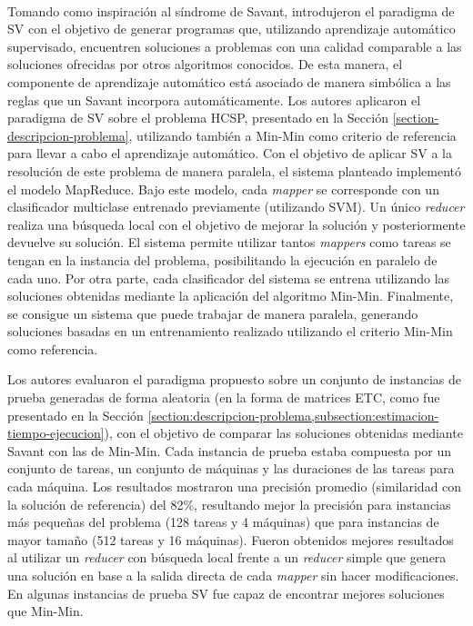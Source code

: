 \paragraph{}Tomando como inspiración al síndrome de Savant, \citet{savant-original} introdujeron el paradigma de SV con el objetivo de generar programas que, utilizando aprendizaje automático supervisado, encuentren soluciones a problemas con una calidad comparable a las soluciones ofrecidas por otros algoritmos conocidos.
De esta manera, el componente de aprendizaje automático está asociado de manera simbólica a las reglas que un Savant incorpora automáticamente.
Los autores aplicaron el paradigma de SV sobre el problema HCSP, presentado en la Sección \ref{section-descripcion-problema}, utilizando también a Min-Min como criterio de referencia para llevar a cabo el aprendizaje automático.
Con el objetivo de aplicar SV a la resolución de este problema de manera paralela, el sistema planteado implementó el modelo MapReduce.
Bajo este modelo, cada \textit{mapper} se corresponde con un clasificador multiclase entrenado previamente (utilizando SVM). Un único \textit{reducer} realiza una búsqueda local con el objetivo de mejorar la solución y posteriormente devuelve su solución.
El sistema permite utilizar tantos \textit{mappers} como tareas se tengan en la instancia del problema, posibilitando la ejecución en paralelo de cada uno.
Por otra parte, cada clasificador del sistema se entrena utilizando las soluciones obtenidas mediante la aplicación del algoritmo Min-Min.
Finalmente, se consigue un sistema que puede trabajar de manera paralela, generando soluciones basadas en un entrenamiento realizado utilizando el criterio Min-Min como referencia. 

Los autores evaluaron el paradigma propuesto sobre un conjunto de instancias de prueba generadas de forma aleatoria (en la forma de matrices ETC, como fue presentado en la Sección \ref{section:descripcion-problema,subsection:estimacion-tiempo-ejecucion}), con el objetivo de comparar las soluciones obtenidas mediante Savant con las de Min-Min.
Cada instancia de prueba estaba compuesta por un conjunto de tareas, un conjunto de máquinas y las duraciones de las tareas para cada máquina. 
Los resultados mostraron una precisión promedio (similaridad con la solución de referencia) del 82\%, resultando mejor la precisión para instancias más pequeñas del problema (128 tareas y 4 máquinas) que para instancias de mayor tamaño (512 tareas y 16 máquinas). 
Fueron obtenidos mejores resultados al utilizar un \textit{reducer} con búsqueda local frente a un \textit{reducer} simple que genera una solución en base a la salida directa de cada \textit{mapper} sin hacer modificaciones.
En algunas instancias de prueba SV fue capaz de encontrar mejores soluciones que Min-Min. 

